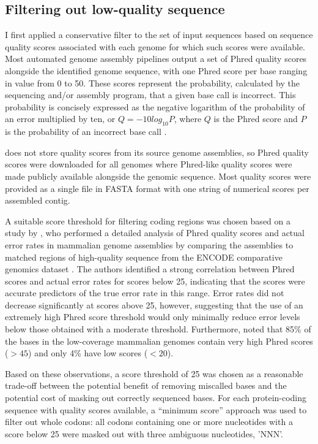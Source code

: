 \subsection{Filtering out low-quality sequence}

I first applied a conservative filter to the set of input sequences
based on sequence quality scores associated with each genome for which
such scores were available. Most automated genome assembly pipelines
output a set of Phred quality scores alongside the identified genome
sequence, with one Phred score per base ranging in value from 0 to
50. These scores represent the probability, calculated by the
sequencing and/or assembly program, that a given base call is
incorrect. This probability is concisely expressed as the negative
logarithm of the probability of an error multiplied by ten, or
$Q=-10log_{10}P$, where $Q$ is the Phred score and $P$ is the
probability of an incorrect base call \citep{Cock2010}.

\ens does not store quality scores from its source genome assemblies,
so Phred quality scores were downloaded for all \lcv genomes where
Phred-like quality scores were made publicly available alongside the
genomic sequence. Most quality scores were provided as a single file
in FASTA format with one string of numerical scores per assembled
contig.

A suitable score threshold for filtering coding regions was chosen
based on a study by \citet{Hubisz2011}, who performed a detailed
analysis of Phred quality scores and actual error rates in \lcv
mammalian genome assemblies by comparing the \lcv assemblies to
matched regions of high-quality sequence from the ENCODE comparative
genomics dataset \citep{Birney2007}. The authors identified a strong
correlation between Phred scores and actual error rates for scores
below 25, indicating that the scores were accurate predictors of the
true error rate in this range. Error rates did not decrease
significantly at scores above 25, however, suggesting that the use of
an extremely high Phred score threshold would only minimally reduce
error levels below those obtained with a moderate
threshold. Furthermore, \citet{Hubisz2011} noted that 85\% of the
bases in the low-coverage mammalian genomes contain very high Phred
scores ($>45$) and only 4\% have low scores ($<20$).

Based on these observations, a score threshold of 25 was chosen as a
reasonable trade-off between the potential benefit of removing
miscalled bases and the potential cost of masking out correctly
sequenced bases. For each protein-coding sequence with quality scores
available, a ``minimum score'' approach was used to filter out whole
codons: all codons containing one or more nucleotides with a score
below 25 were masked out with three ambiguous nucleotides, 'NNN'.

